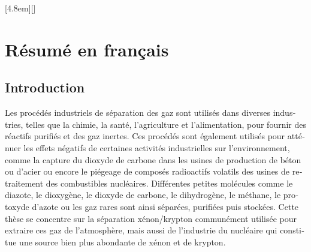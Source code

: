 \documentclass[thesis]{subfiles}
\begin{document}
\begin{otherlanguage}{french}

\renewcommand{\thesection}{\arabic{section}}
\renewcommand{\thesubsection}{\arabic{section}.\arabic{subsection}}
\renewcommand{\thefigure}{R\arabic{figure}}
\setcounter{figure}{0}
[4.8em]{\addvspace{0.1em}}{\contentslabel{2.2em}}{}{\contentspage}[]

\chapter*{Résumé en français}
\startcontents[chapters]
\printpartialtoc

\section*{Introduction}

Les procédés industriels de séparation des gaz sont utilisés dans diverses industries, telles que la chimie, la santé, l'agriculture et l'alimentation, pour fournir des réactifs purifiés et des gaz inertes. Ces procédés sont également utilisés pour atténuer les effets négatifs de certaines activités industrielles sur l'environnement, comme la capture du dioxyde de carbone dans les usines de production de béton ou d'acier ou encore le piégeage de composés radioactifs volatils des usines de retraitement des combustibles nucléaires. Différentes petites molécules comme le diazote, le dioxygène, le dioxyde de carbone, le dihydrogène, le méthane, le protoxyde d'azote ou les gaz rares sont ainsi séparées, purifiées puis stockées. Cette thèse se concentre sur la séparation xénon/krypton communément utilisée pour extraire ces gaz de l'atmosphère, mais aussi de l'industrie du nucléaire qui constitue une source bien plus abondante de xénon et de krypton.


\end{otherlanguage}
\end{document}
